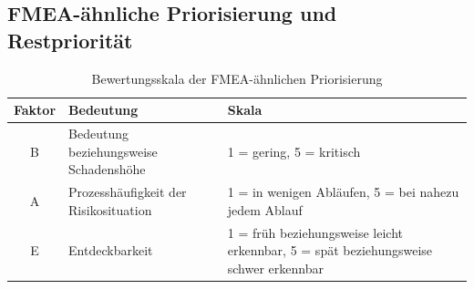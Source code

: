 \documentclass[a4paper,12pt]{article}
\newcommand{\LandscapePageNumbersOn}{%
    \pagestyle{empty}%
    \thispagestyle{empty}%
    \AddToShipoutPictureFG{%
        \AtPageLowerLeft{%
            \put(
                \LenToUnit{\dimexpr\paperwidth-12mm\relax},
                \LenToUnit{.5\paperheight}
            ){%
                \rotatebox{90}{\makebox[0pt][c]{\thepage}}%
            }%
        }%
    }%
}
\newcommand{\LandscapePageNumbersOff}{%
    \ClearShipoutPictureFG%
    \pagestyle{appendixpages}%
}
\begin{document}
\LandscapePageNumbersOff

\clearpage
{}
\begin{landscape}
\LandscapePageNumbersOn
\subsection{FMEA-ähnliche Priorisierung und Restpriorität}
\label{anhang:fmea-priorisierung}

\begin{table}[H]
    \centering
    \caption{Bewertungsskala der FMEA-ähnlichen Priorisierung}
    \label{tab:fmea-bewertungsskala}
    \begin{tabularx}{0.78\linewidth}{@{}cXX@{}}
        \toprule
        Faktor & Bedeutung & Skala \\
        \midrule
        B & Bedeutung beziehungsweise Schadenshöhe & 1 = gering, 5 = kritisch \\
        A & Prozesshäufigkeit der Risikosituation & 1 = in wenigen Abläufen, 5 = bei nahezu jedem Ablauf \\
        E & Entdeckbarkeit & 1 = früh beziehungsweise leicht erkennbar, 5 = spät beziehungsweise schwer erkennbar \\
        \bottomrule
    \end{tabularx}
\end{table}


\end{landscape}
\end{document}
